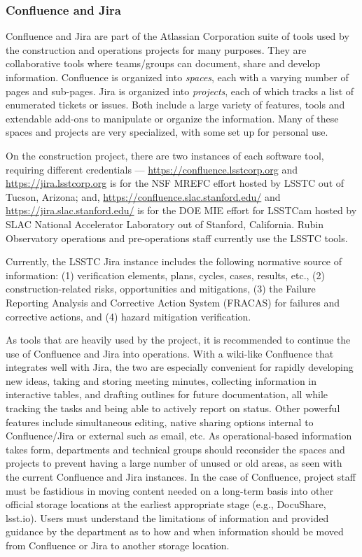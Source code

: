 \subsubsection{Confluence and Jira}
\label{confluence-jira-storage}

Confluence \citep{Confluence-cite} and Jira \citep{Jira-cite} are part of the Atlassian Corporation suite of tools used by the construction and operations projects for many purposes.
They are collaborative tools where teams/groups can document, share and develop information.
Confluence is organized into \emph{spaces}, each with a varying number of pages and sub-pages.
Jira is organized into \emph{projects}, each of which tracks a list of enumerated tickets or issues.
Both include a large variety of features, tools and extendable add-ons to manipulate or organize the information.
Many of these spaces and projects are very specialized, with some set up for personal use.

On the construction project, there are two instances of each software tool, requiring different credentials --- \url{https://confluence.lsstcorp.org} and \url{https://jira.lsstcorp.org} is for the NSF MREFC effort hosted by LSSTC out of Tucson, Arizona; and, \url{https://confluence.slac.stanford.edu/} and \url{https://jira.slac.stanford.edu/} is for the DOE MIE effort for LSSTCam hosted by SLAC National Accelerator Laboratory out of Stanford, California.
Rubin Observatory operations and pre-operations staff currently use the LSSTC tools.

Currently, the LSSTC Jira instance includes the following normative source of information:
(1) verification elements, plans, cycles, cases, results, etc.,
(2) construction-related risks, opportunities and mitigations,
(3) the Failure Reporting Analysis and Corrective Action System (FRACAS) for failures and corrective actions,
and (4) hazard mitigation verification.

As tools that are heavily used by the project, it is recommended to continue the use of Confluence and Jira into operations.
With a wiki-like Confluence that integrates well with Jira, the two are especially convenient for rapidly developing new ideas, taking and storing meeting minutes, collecting information in interactive tables, and drafting outlines for future documentation, all while tracking the tasks and being able to actively report on status.
Other powerful features include simultaneous editing, native sharing options internal to Confluence/Jira or external such as email, etc.
As operational-based information takes form, departments and technical groups should reconsider the spaces and projects to prevent having a large number of unused or old areas, as seen with the current Confluence and Jira instances.
In the case of Confluence, project staff must be fastidious in moving content needed on a long-term basis into other official storage locations at the earliest appropriate stage (e.g., DocuShare, lsst.io).
Users must understand the limitations of information and provided guidance by the department as to how and when information should be moved from Confluence or Jira to another storage location.

